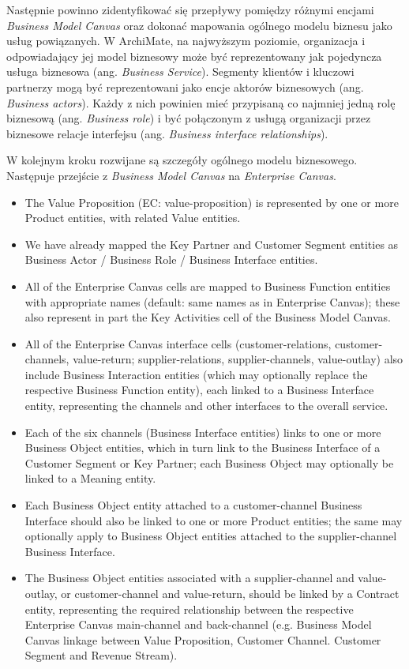 Następnie powinno zidentyfikować się przepływy pomiędzy różnymi encjami \emph{Business Model Canvas} oraz dokonać mapowania ogólnego modelu biznesu jako usług powiązanych. W ArchiMate, na najwyższym poziomie, organizacja i odpowiadający jej model biznesowy może być reprezentowany jak pojedyncza usługa biznesowa (ang. \emph{Business Service}). Segmenty klientów i kluczowi partnerzy mogą być reprezentowani jako encje aktorów biznesowych (ang. \emph{Business actors}). Każdy z nich powinien mieć przypisaną co najmniej jedną rolę biznesową (ang. \emph{Business role}) i być połączonym z usługą organizacji przez biznesowe relacje interfejsu (ang. \emph{Business interface relationships}).

W kolejnym kroku rozwijane są szczegóły ogólnego modelu biznesowego. Następuje przejście z \emph{Business Model Canvas} na \emph{Enterprise Canvas}. 

\begin{itemize}
\item{The Value Proposition (EC: value-proposition) is represented by one or more Product entities, with related Value entities.}
\item{We have already mapped the Key Partner and Customer Segment entities as Business Actor / Business Role / Business Interface entities.}
\item{All of the Enterprise Canvas cells are mapped to Business Function entities with appropriate names (default: same names as in Enterprise Canvas); these also represent in part the Key Activities cell of the Business Model Canvas.}
\item{All of the Enterprise Canvas interface cells (customer-relations, customer-channels, value-return; supplier-relations, supplier-channels, value-outlay) also include Business Interaction entities (which may optionally replace the respective Business Function entity), each linked to a Business Interface entity, representing the channels and other interfaces to the overall service.}
\item{Each of the six channels (Business Interface entities) links to one or more Business Object entities, which in turn link to the Business Interface of a Customer Segment or Key Partner; each Business Object may optionally be linked to a Meaning entity.}
\item{Each Business Object entity attached to a customer-channel Business Interface should also be linked to one or more Product entities; the same may optionally apply to Business Object entities attached to the supplier-channel Business Interface.}
\item{The Business Object entities associated with a supplier-channel and value-outlay, or customer-channel and value-return, should be linked by a Contract entity, representing the required relationship between the respective Enterprise Canvas main-channel and back-channel (e.g. Business Model Canvas linkage between Value Proposition, Customer Channel. Customer Segment and Revenue Stream).}
\end{itemize}

